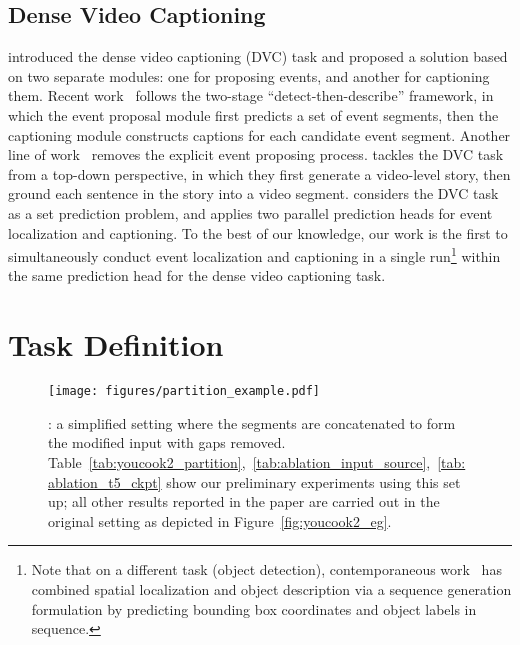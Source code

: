 \documentclass[11pt]{article}
\begin{document}
\subsection{Dense Video Captioning}
 \citet{Krishna2017DenseCaptioningEI} introduced the dense video captioning (DVC) task and proposed a solution based on two separate modules: one for proposing events, and another for captioning them. 
Recent work~\citep{ZhXuCoAAAI18,Li2018JointlyLA,Wang2018BidirectionalAF,Zhou2018EndtoEndDV,Mun2019StreamlinedDV,Iashin2020MultimodalDV} follows the two-stage ``detect-then-describe'' framework, in which the event proposal module first predicts a set of event segments, then the captioning module constructs captions for each candidate event segment.
Another line of work~\citep{Deng2021SketchGA,Wang2021EndtoEndDV} removes the explicit event proposing process. \citet{Deng2021SketchGA} tackles the DVC task from a top-down perspective, in which they first generate a video-level story, then ground each sentence in the story into a video segment.
\citet{Wang2021EndtoEndDV} considers the DVC task as a set prediction problem, and applies two parallel prediction heads for event localization and captioning. 
To the best of our knowledge, our work is the first to simultaneously conduct event localization and captioning in a single run\footnote{
Note that on a different task (object detection), contemporaneous work~\citep{chen2022pixseq} has combined spatial localization and object description via a sequence generation formulation by predicting bounding box coordinates and object labels in sequence.} within the same prediction head for the dense video captioning task.
 



\section{Task Definition}
\label{sec:task_definition}


\begin{figure*}[tbp]
    \centering
    \caption{An example of the input video and output segmentations and captions from the YouCook2 dataset.
}
    \label{fig:youcook2_eg}
\end{figure*}

\begin{figure}[tbp]
    \centering
    \texttt{[image: figures/partition\_example.pdf]}
    \caption{\Partitiontask: a simplified setting where the segments are concatenated to form the modified input with gaps removed. 
    Table~\ref{tab:youcook2_partition},~\ref{tab:ablation_input_source},~\ref{tab:ablation_t5_ckpt} show our preliminary experiments using this set up; all other results reported in the paper are carried out in the original setting as depicted in Figure~\ref{fig:youcook2_eg}.
    }
    \label{fig:partition_eg}
\end{figure}
\end{document}
